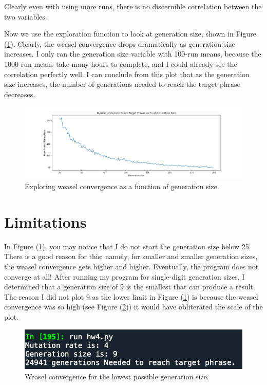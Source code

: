 \documentclass[12pt, letterpaper]{article}
\begin{document}
Clearly even with using more runs, there is no discernible correlation between the two variables.

Now we use the exploration function to look at generation size, shown in Figure (\ref{fig:vargen}). Clearly, the weasel convergence drops dramatically as generation size increases. I only ran the generation size variable with 100-run means, because the 1000-run means take many hours to complete, and I could already see the correlation perfectly well. I can conclude from this plot that as the generation size increases, the number of generations needed to reach the target phrase decreases.

\begin{figure}[!ht]
  \centering
  \includegraphics[width=12cm]{../plots/Gen_mean_100_25_to_200.png}
  \caption{Exploring weasel convergence as a function of generation size.}
  \label{fig:vargen}
\end{figure}



\section{Limitations}

In Figure (\ref{fig:vargen}), you may notice that I do not start the generation size below 25. There is a good reason for this; namely, for smaller and smaller generation sizes, the weasel convergence gets higher and higher. Eventually, the program does not converge at all! After running my program for single-digit generation sizes, I determined that a generation size of 9 is the smallest that can produce a result. The reason I did not plot 9 as the lower limit in Figure (\ref{fig:vargen}) is because the weasel convergence was so high (see Figure (\ref{fig:lowlim})) it would have obliterated the scale of the plot. 

\begin{figure}[!ht]
  \centering
  \includegraphics[width=12cm]{gen_size_9.png}
  \caption{Weasel convergence for the lowest possible generation size.}
  \label{fig:lowlim}
\end{figure}
\end{document}

